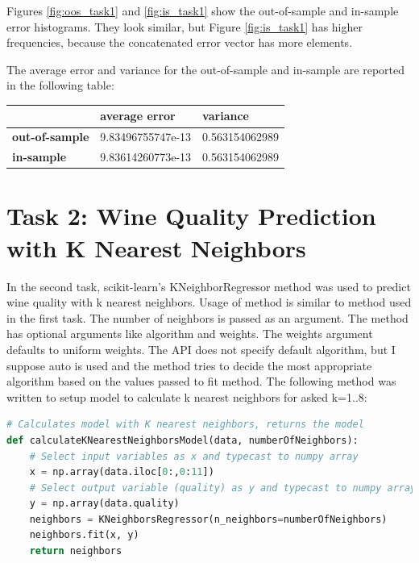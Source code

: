 \documentclass[12pt]{article}
\begin{document}
Figures \ref{fig:oos_task1} and \ref{fig:is_task1} show the out-of-sample and in-sample error histograms. They look similar, but Figure \ref{fig:is_task1} has higher frequencies, because the concatenated error vector has more elements.

\vspace{5mm} %

The average error and variance for the out-of-sample and in-sample are reported in the following table:

\begin{center}
    \begin{tabular}{ | l | l | l |}
    \hline
     & \textbf{average error} & \textbf{variance}  \\ \hline
   	 \textbf{out-of-sample} & 9.83496755747e-13 & 0.563154062989 \\ \hline
   	 \textbf{in-sample} & 9.83614260773e-13 & 0.563154062989 \\ \hline
    \end{tabular}
\end{center}

\section{Task 2: Wine Quality Prediction with K Nearest Neighbors}

In the second task, scikit-learn's KNeighborRegressor method was used to predict wine quality with k nearest neighbors. Usage of method is similar to method used in the first task. The number of neighbors is passed as an argument. The method has optional arguments like algorithm and weights. The weights argument defaults to uniform weights. The API does not specify default algorithm, but I suppose auto is used and the method tries to decide the most appropriate algorithm based on the values passed to fit method. The following method was written to setup model to calculate k nearest neighbors for asked k=1..8:

\begin{lstlisting}[language=Python]
# Calculates model with K nearest neighbors, returns the model
def calculateKNearestNeighborsModel(data, numberOfNeighbors):
	# Select input variables as x and typecast to numpy array
	x = np.array(data.iloc[0:,0:11])
	# Select output variable (quality) as y and typecast to numpy array
	y = np.array(data.quality)
	neighbors = KNeighborsRegressor(n_neighbors=numberOfNeighbors)
	neighbors.fit(x, y)
	return neighbors
\end{lstlisting}
\end{document}
